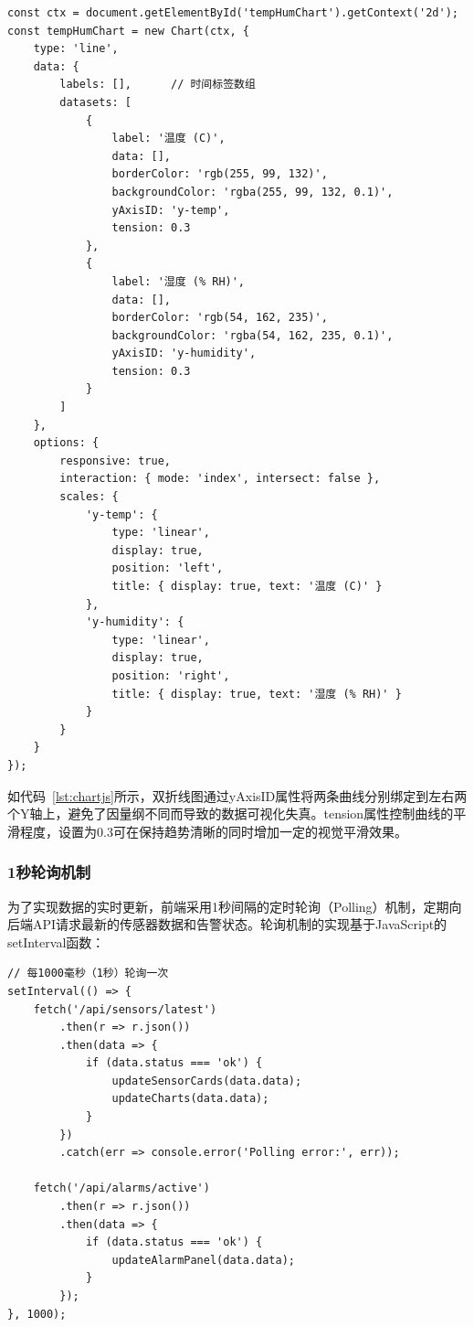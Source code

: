 \documentclass[12pt,a4paper]{ctexart}
\begin{document}
\begin{lstlisting}[caption={Chart.js双折线图配置},label={lst:chartjs}]
const ctx = document.getElementById('tempHumChart').getContext('2d');
const tempHumChart = new Chart(ctx, {
    type: 'line',
    data: {
        labels: [],      // 时间标签数组
        datasets: [
            {
                label: '温度 (C)',
                data: [],
                borderColor: 'rgb(255, 99, 132)',
                backgroundColor: 'rgba(255, 99, 132, 0.1)',
                yAxisID: 'y-temp',
                tension: 0.3
            },
            {
                label: '湿度 (% RH)',
                data: [],
                borderColor: 'rgb(54, 162, 235)',
                backgroundColor: 'rgba(54, 162, 235, 0.1)',
                yAxisID: 'y-humidity',
                tension: 0.3
            }
        ]
    },
    options: {
        responsive: true,
        interaction: { mode: 'index', intersect: false },
        scales: {
            'y-temp': {
                type: 'linear',
                display: true,
                position: 'left',
                title: { display: true, text: '温度 (C)' }
            },
            'y-humidity': {
                type: 'linear',
                display: true,
                position: 'right',
                title: { display: true, text: '湿度 (% RH)' }
            }
        }
    }
});
\end{lstlisting}

如代码~\ref{lst:chartjs}所示，双折线图通过yAxisID属性将两条曲线分别绑定到左右两个Y轴上，避免了因量纲不同而导致的数据可视化失真。tension属性控制曲线的平滑程度，设置为0.3可在保持趋势清晰的同时增加一定的视觉平滑效果。

\subsubsection{1秒轮询机制}

为了实现数据的实时更新，前端采用1秒间隔的定时轮询（Polling）机制，定期向后端API请求最新的传感器数据和告警状态。轮询机制的实现基于JavaScript的setInterval函数：

\begin{lstlisting}[caption={前端轮询机制实现},label={lst:polling}]
// 每1000毫秒（1秒）轮询一次
setInterval(() => {
    fetch('/api/sensors/latest')
        .then(r => r.json())
        .then(data => {
            if (data.status === 'ok') {
                updateSensorCards(data.data);
                updateCharts(data.data);
            }
        })
        .catch(err => console.error('Polling error:', err));
    
    fetch('/api/alarms/active')
        .then(r => r.json())
        .then(data => {
            if (data.status === 'ok') {
                updateAlarmPanel(data.data);
            }
        });
}, 1000);
\end{lstlisting}
\end{document}
